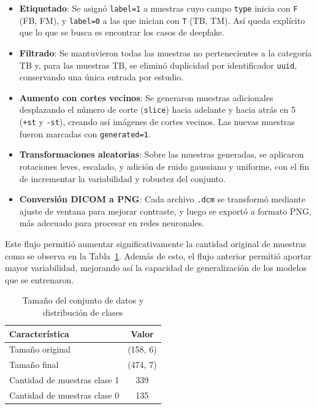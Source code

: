 \documentclass[conference]{IEEEtran}
\begin{document}
\begin{itemize}
    \item \textbf{Etiquetado}: Se asignó \texttt{label=1} a muestras cuyo campo \texttt{type} inicia con \texttt{F} (FB, FM), y \texttt{label=0} a las que inician con \texttt{T} (TB, TM). Así queda explícito que lo que se busca es encontrar los casos de deepfake.
    \item \textbf{Filtrado}: Se mantuvieron todas las muestras no pertenecientes a la categoría TB y, para las muestras TB, se eliminó duplicidad por identificador \texttt{uuid}, conservando una única entrada por estudio.
    \item \textbf{Aumento con cortes vecinos}: Se generaron muestras adicionales desplazando el número de corte (\texttt{slice}) hacia adelante y hacia atrás en 5 (\texttt{+st} y \texttt{-st}), creando así imágenes de cortes vecinos. Las nuevas muestras fueron marcadas con \texttt{generated=1}.
    \item \textbf{Transformaciones aleatorias}: Sobre las muestras generadas, se aplicaron rotaciones leves, escalado, y adición de ruido gaussiano y uniforme, con el fin de incrementar la variabilidad y robustez del conjunto.
    \item \textbf{Conversión DICOM a PNG}: Cada archivo \texttt{.dcm} se transformó mediante ajuste de ventana para mejorar contraste, y luego se exportó a formato PNG, más adecuado para procesar en redes neuronales.
\end{itemize}

Este flujo permitió aumentar significativamente la cantidad original de muestras como se observa en la Tabla~\ref{tab:dataset}. Además de esto, el flujo anterior permitió  aportar mayor variabilidad, mejorando así la capacidad de generalización de los modelos que se entrenaron.

\begin{table}[h]
\centering
\caption{Tamaño del conjunto de datos y distribución de clases}
\begin{tabular}{lc}
\toprule
\textbf{Característica} & \textbf{Valor} \\
\midrule
Tamaño original & (158, 6) \\
Tamaño final & (474, 7) \\
Cantidad de muestras clase 1 & 339 \\
Cantidad de muestras clase 0 & 135 \\
\bottomrule
\end{tabular}
\label{tab:dataset}
\end{table}
\end{document}

